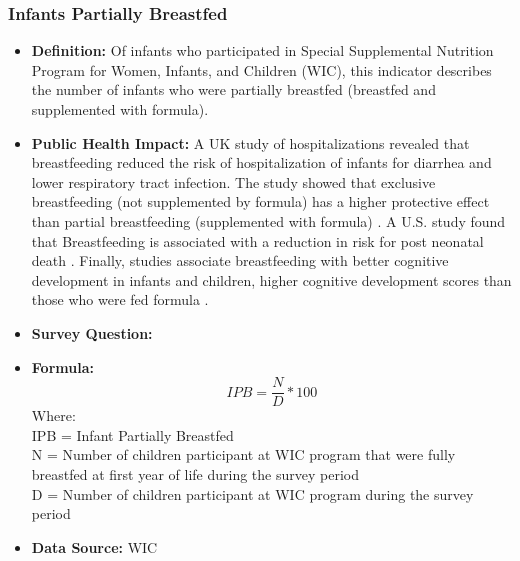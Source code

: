 \documentclass[12pt,letterpaper]{report}
\begin{document}
\subsubsection{Infants Partially Breastfed}
\begin{itemize}
		\item \textbf{Definition:} Of infants who participated in Special Supplemental Nutrition Program for Women, Infants, and Children (WIC), this indicator describes the number of infants who were partially breastfed (breastfed and supplemented with formula).
		\item \textbf{Public Health Impact:} A UK study of hospitalizations revealed that breastfeeding reduced the risk of hospitalization of infants for diarrhea and lower respiratory tract infection. The study showed that exclusive breastfeeding (not supplemented by formula) has a higher protective effect than partial breastfeeding (supplemented with formula) \cite{quigley2007breastfeeding}. A U.S. study found that Breastfeeding is associated with a reduction in risk for post neonatal death \cite{chen2004breastfeeding}. Finally, studies associate breastfeeding with better cognitive development in infants and children, higher cognitive development scores than those who were fed formula \cite{anderson1999breast}. 
		\item \textbf{Survey Question:}
		\item \textbf{Formula:} 
			\begin{equation}
				IPB = \frac{N}{D} *100
			\end{equation}
Where: \\
			IPB = Infant Partially Breastfed \\
			
			N = Number of children participant at WIC program that were fully breastfed at first year of life during the survey period\\
			
			D = Number of children participant at WIC program during the survey period\\
			
		\item \textbf{Data Source:} WIC
	\end{itemize}
\end{document}
